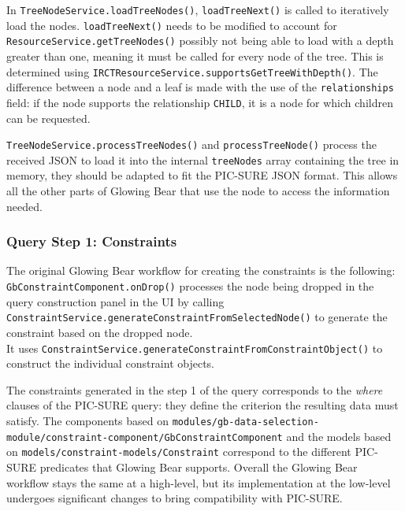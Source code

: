 In \verb|TreeNodeService.loadTreeNodes()|, \verb|loadTreeNext()| is called to iteratively load the nodes.
\verb|loadTreeNext()| needs to be modified to account for \verb|ResourceService.getTreeNodes()| possibly not being able to load with a depth greater than one, meaning it must be called for every node of the tree.
This is determined using \verb|IRCTResourceService.supportsGetTreeWithDepth()|.
The difference between a node and a leaf is made with the use of the \verb|relationships| field: if the node supports the relationship \verb|CHILD|, it is a node for which children can be requested.

\verb|TreeNodeService.processTreeNodes()| and \verb|processTreeNode()| process the received JSON to load it into the internal \verb|treeNodes| array containing the tree in memory, they should be adapted to fit the PIC-SURE JSON format.
This allows all the other parts of Glowing Bear that use the node to access the information needed.


\subsubsection{Query Step 1: Constraints}

The original Glowing Bear workflow for creating the constraints is the following: \\
\verb|GbConstraintComponent.onDrop()| processes the node being dropped in the query construction panel in the UI by calling \verb|ConstraintService.generateConstraintFromSelectedNode()| to generate the constraint based on the dropped node. \\
It uses \verb|ConstraintService.generateConstraintFromConstraintObject()| to construct the individual constraint objects.

The constraints generated in the step 1 of the query corresponds to the \emph{where} clauses of the PIC-SURE query: they define the criterion the resulting data must satisfy.
The components based on \verb|modules/gb-data-selection-module/constraint-component/GbConstraintComponent| and the models based on \verb|models/constraint-models/Constraint| correspond to the different PIC-SURE predicates that Glowing Bear supports.
Overall the Glowing Bear workflow stays the same at a high-level, but its implementation at the low-level undergoes significant changes to bring compatibility with PIC-SURE.


